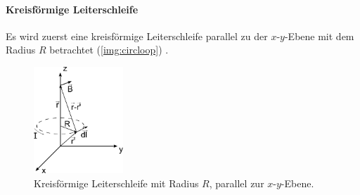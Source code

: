\paragraph{Kreisförmige Leiterschleife}
Es wird zuerst eine kreisförmige Leiterschleife parallel zu der $x$-$y$-Ebene mit dem Radius $R$ betrachtet (\autoref{img:circloop}) \cite{dem2}.
\begin{figure}[H]
\begin{center}
  \includegraphics[width=0.3\textwidth]{../img/circloop.pdf}
  \caption{Kreisförmige Leiterschleife mit Radius $R$, parallel zur $x$-$y$-Ebene.}
  \label{img:circloop}
\end{center}
\end{figure}

